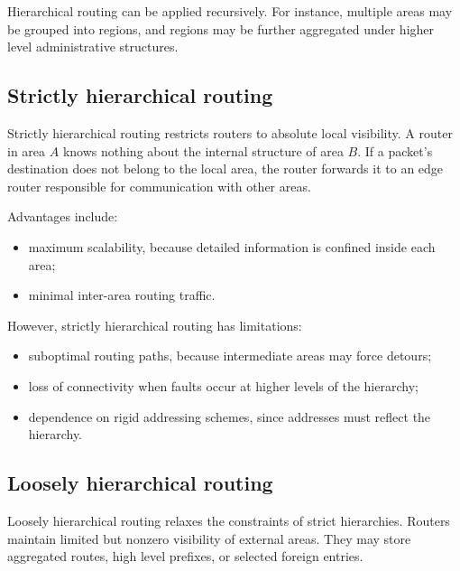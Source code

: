 \begin{center}
\end{center}

Hierarchical routing can be applied recursively. For instance, multiple areas may be grouped into regions, and regions may be further aggregated under higher level administrative structures.

\subsection{Strictly hierarchical routing}

Strictly hierarchical routing restricts routers to absolute local visibility. A router in area $A$ knows nothing about the internal structure of area $B$. If a packet's destination does not belong to the local area, the router forwards it to an edge router responsible for communication with other areas.

Advantages include:

\begin{itemize}
\item maximum scalability, because detailed information is confined inside each area;
\item minimal inter-area routing traffic.
\end{itemize}

However, strictly hierarchical routing has limitations:

\begin{itemize}
\item suboptimal routing paths, because intermediate areas may force detours;
\item loss of connectivity when faults occur at higher levels of the hierarchy;
\item dependence on rigid addressing schemes, since addresses must reflect the hierarchy.
\end{itemize}

\subsection{Loosely hierarchical routing}

Loosely hierarchical routing relaxes the constraints of strict hierarchies. Routers maintain limited but nonzero visibility of external areas. They may store aggregated routes, high level prefixes, or selected foreign entries.

\begin{center}
\end{center}

